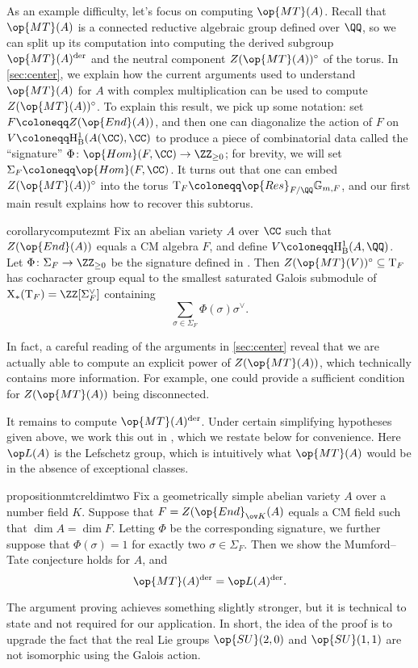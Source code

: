 \documentclass[openany]{book}
\begin{document}
As an example difficulty, let's focus on computing $\op{MT}(A)$. Recall that $\op{MT}(A)$ is a connected reductive algebraic group defined over $\QQ$, so we can split up its computation into computing the derived subgroup $\op{MT}(A)^{\mathrm{der}}$ and the neutral component $Z(\op{MT}(A))^\circ$ of the torus. In \cref{sec:center}, we explain how the current arguments used to understand $\op{MT}(A)$ for $A$ with complex multiplication can be used to compute $Z(\op{MT}(A))^\circ$. To explain this result, we pick up some notation: set $F\coloneqq Z(\op{End}(A))$, and then one can diagonalize the action of $F$ on $V\coloneqq\mathrm H^1_{\mathrm B}(A(\CC),\CC)$ to produce a piece of combinatorial data called the ``signature'' $\Phi\colon\op{Hom}(F,\CC)\to\ZZ_{\ge0}$; for brevity, we will set $\Sigma_F\coloneqq\op{Hom}(F,\CC)$. It turns out that one can embed $Z(\op{MT}(A))^\circ$ into the torus $\mathrm T_F\coloneqq\op{Res}_{F/\QQ}\mathbb G_{m,F}$, and our first main result explains how to recover this subtorus.
\begin{restatable*}{corollary}{computezmt} \label{cor:compute-z-mt}
	Fix an abelian variety $A$ over $\CC$ such that $Z(\op{End}(A))$ equals a CM algebra $F$, and define $V\coloneqq\mathrm H^1_{\mathrm B}(A,\QQ)$. Let $\Phi\colon\Sigma_F\to\ZZ_{\ge0}$ be the signature defined in . Then $Z(\op{MT}(V))^\circ\subseteq\mathrm T_F$ has cocharacter group equal to the smallest saturated Galois submodule of $\mathrm X_*(\mathrm T_F)=\ZZ[\Sigma_F^\lor]$ containing
	\[\sum_{\sigma\in\Sigma_F}\Phi(\sigma)\sigma^\lor.\]
\end{restatable*}
\begin{remark}
	In fact, a careful reading of the arguments in \cref{sec:center} reveal that we are actually able to compute an explicit power of $Z(\op{MT}(A))$, which technically contains more information. For example, one could provide a sufficient condition for $Z(\op{MT}(A))$ being disconnected.
\end{remark}
It remains to compute $\op{MT}(A)^{\mathrm{der}}$. Under certain simplifying hypotheses given above, we work this out in , which we restate below for convenience. Here $\op L(A)$ is the Lefschetz group, which is intuitively what $\op{MT}(A)$ would be in the absence of exceptional classes.
\begin{restatable*}{proposition}{mtcreldimtwo} \label{prop:mtc-reldim-2}
	Fix a geometrically simple abelian variety $A$ over a number field $K$. Suppose that $F=Z(\op{End}_{\ov K}(A)$ equals a CM field such that $\dim A=\dim F$. Letting $\Phi$ be the corresponding signature, we further suppose that $\Phi(\sigma)=1$ for exactly two $\sigma\in\Sigma_F$. Then we show the Mumford--Tate conjecture holds for $A$, and
	\[\op{MT}(A)^{\mathrm{der}}=\op L(A)^{\mathrm{der}}.\]
\end{restatable*}
\noindent The argument proving  achieves something slightly stronger, but it is technical to state and not required for our application. In short, the idea of the proof is to upgrade the fact that the real Lie groups $\op{SU}(2,0)$ and $\op{SU}(1,1)$ are not isomorphic using the Galois action.
\end{document}
